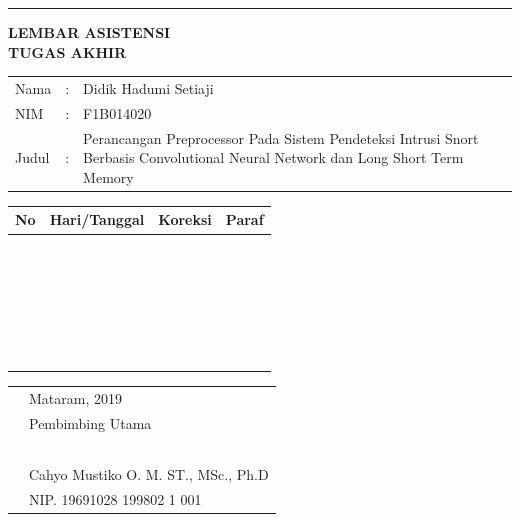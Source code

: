 \documentclass{report}
\begin{document}
\noindent\rule{\textwidth}{2pt}
\begin{center}
    \textbf{LEMBAR ASISTENSI\\
    TUGAS AKHIR}\\
\end{center}
\begin{tabularx}{\textwidth}{llX}
Nama & : & Didik Hadumi Setiaji \\
NIM & : & F1B014020 \\
Judul & : & Perancangan Preprocessor Pada Sistem Pendeteksi Intrusi Snort Berbasis Convolutional Neural Network dan Long Short Term Memory \\
\end{tabularx}
\begin{table}[H]
    \centering
    \begin{tabularx}{\textwidth}{
    | c %
    | >{\hsize=0.66\hsize }X %
    | >{\hsize=1.34\hsize }X %
    | p{2cm} %
    |}
    \hline
    \textbf{No} & \textbf{Hari/Tanggal} & \textbf{Koreksi} & \textbf{Paraf}\\
    \hline
     & & & \\
     & & & \\
     & & & \\
     & & & \\
     & & & \\
     & & & \\
     & & & \\
     & & & \\
     & & & \\
     & & & \\
     & & & \\
     & & & \\
     & & & \\
     & & & \\
     & & & \\
     & & & \\
     & & & \\
     & & & \\
     & & & \\
     & & & \\
     & & & \\
     & & & \\
     & & & \\
     & & & \\
     & & & \\
     & & & \\
     \hline
    \end{tabularx}
    \label{tab:my_label}
\end{table}
\begin{tabularx}{\textwidth}{XX}
& Mataram, \hspace{3cm} 2019 \\
& Pembimbing Utama \\ \\ \\ \\ \\ \\
& Cahyo Mustiko O. M. ST., MSc., Ph.D \\
& NIP. 19691028 199802 1 001
\end{tabularx}
\end{document}
